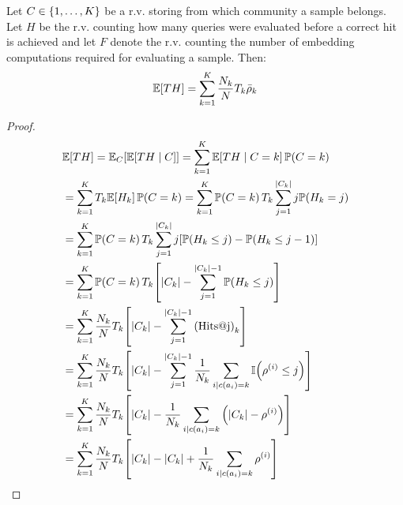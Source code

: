 \begin{lemma}
    \label{lemma:expected_evaluations}
    Let $C \in \mathopen{}\left\{1,\dots,K\right\}$ be a r.v. storing from which community a sample belongs. Let $H$ be the r.v. counting how many queries were evaluated before a correct hit is achieved and let $F$ denote the r.v. counting the number of embedding computations required for evaluating a sample. Then:
    $$\mathbb{E}\mathopen{}\left[T H\right] = \sum_{k=1}^{K}{\frac{N_k}{N} T_k \bar{\rho}_k}$$
\end{lemma}
\begin{proof}
    \begin{align*}
        &\mathbb{E}\off{T H} = \mathbb{E}_{C}\off{\mathbb{E}\off{T H \mid C}}%
        = \sum_{k=1}^{K}{\mathbb{E}\off{T H \mid C=k} \mathbb{P}\of{C=k}}%
        \\
        &= \sum_{k=1}^{K}{T_k \mathbb{E}\off{H_k} \mathbb{P}\of{C=k}}%
        = \sum_{k=1}^{K}{\mathbb{P}\of{C=k} T_k \sum_{j=1}^{\abs{C_k}}{j \mathbb{P}\of{H_k=j}}}%
        \\
        &= \sum_{k=1}^{K}{\mathbb{P}\of{C=k} T_k \sum_{j=1}^{\abs{C_k}}{j \off{\mathbb{P}\of{H_k \leq j} - \mathbb{P}\of{H_k \leq j-1}}}}%
        \\
        &= \sum_{k=1}^{K}{\mathbb{P}\of{C=k} T_k \off{\abs{C_k}- \sum_{j=1}^{\abs{C_k}-1}{\mathbb{P}\of{H_k \leq j}}}}%
        \\
        &= \sum_{k=1}^{K}{\frac{N_k}{N} T_k \off{\abs{C_k}- \sum_{j=1}^{\abs{C_k}-1}{\of{\text{Hits@j}}_k}}}%
        \\
        &= \sum_{k=1}^{K}{\frac{N_k}{N} T_k \off{\abs{C_k}- \sum_{j=1}^{\abs{C_k}-1}{\frac{1}{N_k}\sum_{i \mid c\of{a_i}=k}{\mathbb{I}\of{\rho^{\of{i}} \leq j}}}}}%
        \\
        &= \sum_{k=1}^{K}{\frac{N_k}{N} T_k \off{\abs{C_k}- \frac{1}{N_k}\sum_{i \mid c\of{a_i}=k}{\of{\abs{C_k}- \rho^{\of{i}}}}}}%
        \\
        &= \sum_{k=1}^{K}{\frac{N_k}{N} T_k \off{\abs{C_k}- \abs{C_k} + \frac{1}{N_k}\sum_{i \mid c\of{a_i}=k}{\rho^{\of{i}}}}}%

\end{align*}
\end{proof}
